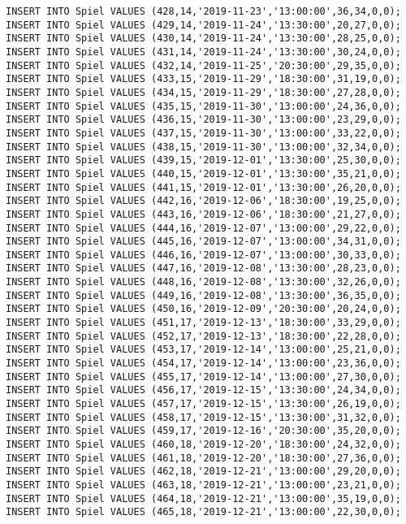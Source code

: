 \documentclass{lehramt-informatik-aufgabe}
\begin{document}
\begin{verbatim}
INSERT INTO Spiel VALUES (428,14,'2019-11-23','13:00:00',36,34,0,0);
INSERT INTO Spiel VALUES (429,14,'2019-11-24','13:30:00',20,27,0,0);
INSERT INTO Spiel VALUES (430,14,'2019-11-24','13:30:00',28,25,0,0);
INSERT INTO Spiel VALUES (431,14,'2019-11-24','13:30:00',30,24,0,0);
INSERT INTO Spiel VALUES (432,14,'2019-11-25','20:30:00',29,35,0,0);
INSERT INTO Spiel VALUES (433,15,'2019-11-29','18:30:00',31,19,0,0);
INSERT INTO Spiel VALUES (434,15,'2019-11-29','18:30:00',27,28,0,0);
INSERT INTO Spiel VALUES (435,15,'2019-11-30','13:00:00',24,36,0,0);
INSERT INTO Spiel VALUES (436,15,'2019-11-30','13:00:00',23,29,0,0);
INSERT INTO Spiel VALUES (437,15,'2019-11-30','13:00:00',33,22,0,0);
INSERT INTO Spiel VALUES (438,15,'2019-11-30','13:00:00',32,34,0,0);
INSERT INTO Spiel VALUES (439,15,'2019-12-01','13:30:00',25,30,0,0);
INSERT INTO Spiel VALUES (440,15,'2019-12-01','13:30:00',35,21,0,0);
INSERT INTO Spiel VALUES (441,15,'2019-12-01','13:30:00',26,20,0,0);
INSERT INTO Spiel VALUES (442,16,'2019-12-06','18:30:00',19,25,0,0);
INSERT INTO Spiel VALUES (443,16,'2019-12-06','18:30:00',21,27,0,0);
INSERT INTO Spiel VALUES (444,16,'2019-12-07','13:00:00',29,22,0,0);
INSERT INTO Spiel VALUES (445,16,'2019-12-07','13:00:00',34,31,0,0);
INSERT INTO Spiel VALUES (446,16,'2019-12-07','13:00:00',30,33,0,0);
INSERT INTO Spiel VALUES (447,16,'2019-12-08','13:30:00',28,23,0,0);
INSERT INTO Spiel VALUES (448,16,'2019-12-08','13:30:00',32,26,0,0);
INSERT INTO Spiel VALUES (449,16,'2019-12-08','13:30:00',36,35,0,0);
INSERT INTO Spiel VALUES (450,16,'2019-12-09','20:30:00',20,24,0,0);
INSERT INTO Spiel VALUES (451,17,'2019-12-13','18:30:00',33,29,0,0);
INSERT INTO Spiel VALUES (452,17,'2019-12-13','18:30:00',22,28,0,0);
INSERT INTO Spiel VALUES (453,17,'2019-12-14','13:00:00',25,21,0,0);
INSERT INTO Spiel VALUES (454,17,'2019-12-14','13:00:00',23,36,0,0);
INSERT INTO Spiel VALUES (455,17,'2019-12-14','13:00:00',27,30,0,0);
INSERT INTO Spiel VALUES (456,17,'2019-12-15','13:30:00',24,34,0,0);
INSERT INTO Spiel VALUES (457,17,'2019-12-15','13:30:00',26,19,0,0);
INSERT INTO Spiel VALUES (458,17,'2019-12-15','13:30:00',31,32,0,0);
INSERT INTO Spiel VALUES (459,17,'2019-12-16','20:30:00',35,20,0,0);
INSERT INTO Spiel VALUES (460,18,'2019-12-20','18:30:00',24,32,0,0);
INSERT INTO Spiel VALUES (461,18,'2019-12-20','18:30:00',27,36,0,0);
INSERT INTO Spiel VALUES (462,18,'2019-12-21','13:00:00',29,20,0,0);
INSERT INTO Spiel VALUES (463,18,'2019-12-21','13:00:00',23,21,0,0);
INSERT INTO Spiel VALUES (464,18,'2019-12-21','13:00:00',35,19,0,0);
INSERT INTO Spiel VALUES (465,18,'2019-12-21','13:00:00',22,30,0,0);

\end{verbatim}
\end{document}
